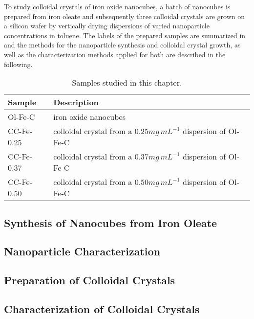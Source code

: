 \documentclass[\main/dresen_thesis.tex]{subfiles}
\renewcommand{\thisPath}{\main/chapters/colloidalCrystals/experimentalMethods/}
\begin{document}
  To study colloidal crystals of iron oxide nanocubes, a batch of nanocubes is prepared from iron oleate and subsequently three colloidal crystals are grown on a silicon wafer by vertically drying dispersions of varied nanoparticle concentrations in toluene.
  The labels of the prepared samples are summarized in  and the methods for the nanoparticle synthesis and colloidal crystal growth, as well as the characterization methods applied for both are described in the following.
  \begin{table}[!htbp]
    \centering
    \caption{\label{tab:colloidalCrystals:expMethods:samples}Samples studied in this chapter.}
    \begin{tabular}{ l | l }
      \textbf{Sample}  & Description \\
      \hline
      Ol-Fe-C       & iron oxide nanocubes\\
      CC-Fe-0.25    & colloidal crystal from a $0.25 \unit{mg \, mL^{-1}}$ dispersion of Ol-Fe-C\\
      CC-Fe-0.37    & colloidal crystal from a $0.37 \unit{mg \, mL^{-1}}$ dispersion of Ol-Fe-C\\
      CC-Fe-0.50    & colloidal crystal from a $0.50 \unit{mg \, mL^{-1}}$ dispersion of Ol-Fe-C\\
      \hline
    \end{tabular}
  \end{table}

  \subsection{Synthesis of  Nanocubes from Iron Oleate}
    
      \FloatBarrier

  \subsection{Nanoparticle Characterization}
    
    \FloatBarrier
    \clearpage

  \subsection{Preparation of Colloidal Crystals}
    
    \FloatBarrier

  \subsection{Characterization of Colloidal Crystals}
    
    \FloatBarrier
\end{document}
